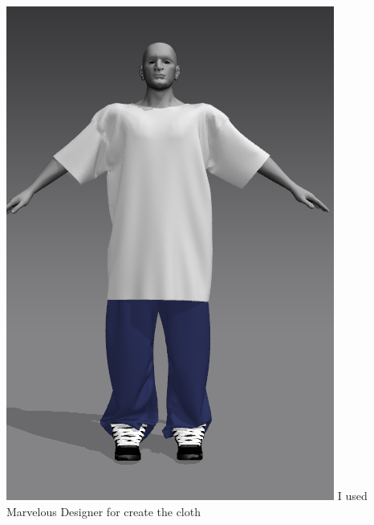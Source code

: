 \documentclass{article}
\begin{document}
  \includegraphics[width=\textwidth]{3.png}
  I used Marvelous Designer for create the cloth
\end{document}
